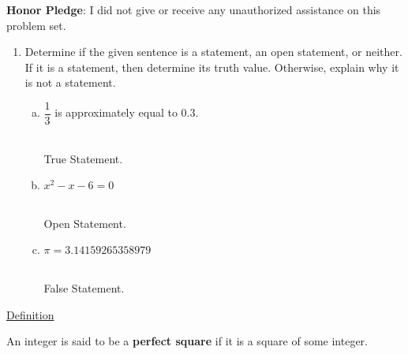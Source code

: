 \documentclass[12pt]{amsart}
\begin{document}
\vfill
\noindent
\textbf{Honor Pledge}: I did not give or receive any unauthorized assistance on this problem set.

\vspace{0.5in}
\hfill\makebox[3.0in]{\hrulefill}

\hfill{}


\newpage
\begin{enumerate}[{\bfseries 1.}]
\item Determine if the given sentence is a statement, an open statement, or neither.  If it is a statement, then determine its truth value.  Otherwise, explain why it is not a statement.
	\begin{enumerate}[(a)]
	\vspace{0.1in}
	\item $\dfrac{1}{3}$ is approximately equal to 0.3.
	\begin{normalize}
	    \vspace{0.1in}
        \\True Statement.\tab
    \end{normalize}
	\vfill
	\item $x^{2}-x-6=0$
	\begin{normalize}
	    \vspace{0.1in}
        \\Open Statement.\tab
    \end{normalize}
	\vfill
	\item $\pi=3.14159265358979$
	\begin{normalize}
	    \vspace{0.1in}
        \\False Statement.\tab
    \end{normalize}
	\vfill
	\vfill
	\end{enumerate}
\end{enumerate}

\noindent
\underline{Definition}

\vspace{0.05in}
\noindent
An integer is said to be a \textbf{perfect square} if it is a square of some integer.
\end{document}
